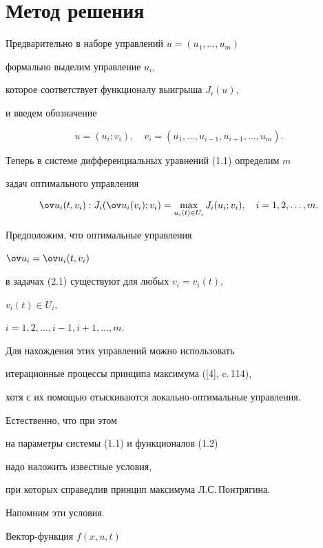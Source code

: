 \section{Метод решения}





Предварительно в наборе управлений $u=(u_{1},\dotsc, u_{m})$


формально выделим управление $u_{i}$,


которое соответствует функционалу выигрыша $J_{i}(u)$,


и введем обозначение


$$


u=(u_{i};v_{i}),\quad v_{i}=(u_{1},\dotsc, u_{i-1},u_{i+1},\dotsc ,u_{m}).


$$


Теперь в системе дифференциальных уравнений (1.1) определим $m$ 


задач оптимального управления 


\begin{equation}


\ov u_{i}(t,v_{i}): J_{i}(\ov u_{i}(v_{i});v_{i})=


\max_{u_{i}(t)\in U_{i}}J_{i}(u_{i};v_{i}),


\quad i=1,2,\dotsc, m.


\end{equation}


Предположим, что оптимальные управления


$\ov u_{i}=\ov u_{i}(t,v_{i})$


в задачах (2.1) существуют для любых $v_{i}=v_{i}(t)$,


$v_{i}(t)\in U_{i}$,


$i=1,2,\dotsc,i-1,i+1,\dotsc, m$.


Для нахождения этих управлений можно использовать 


итерационные процессы принципа максимума ([4], c.\,114),


хотя с их помощью отыскиваются локально-оптимальные управления. 


Естественно, что при этом 


на параметры системы (1.1) и функционалов (1.2) 


надо наложить известные условия, 


при которых справедлив принцип максимума Л.С.\,Понтрягина. 


Напомним эти условия.


Вектор-функция $f(x,u,t)$


